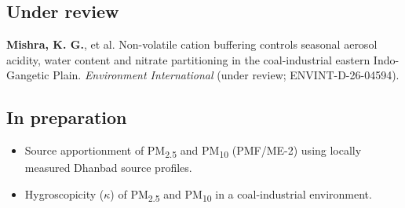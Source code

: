 \documentclass[11pt, a4paper]{article}
\begin{document}
\subsection*{Under review}
\begin{enumerate}[leftmargin=*, label={[\arabic*]}, start=3]
  \item \textbf{Mishra, K. G.}, et al. Non-volatile cation buffering controls seasonal
  aerosol acidity, water content and nitrate partitioning in the coal-industrial
  eastern Indo-Gangetic Plain. \textit{Environment International} (under review;
  ENVINT-D-26-04594).
\end{enumerate}

\subsection*{In preparation}
\begin{itemize}[leftmargin=*]
  \item Source apportionment of PM\textsubscript{2.5} and PM\textsubscript{10} (PMF/ME-2)
  using locally measured Dhanbad source profiles.
  \item Hygroscopicity ($\kappa$) of PM\textsubscript{2.5} and PM\textsubscript{10}
  in a coal-industrial environment.
\end{itemize}

\end{document}
